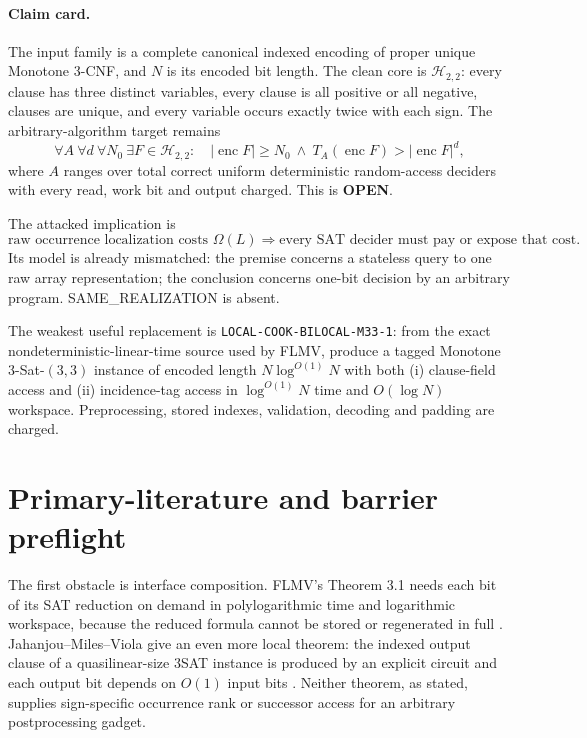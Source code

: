 \documentclass[11pt]{article}
\newcommand{\Htwo}{\mathcal H_{2,2}}
\newcommand{\OPEN}{\textbf{OPEN}}
\begin{document}
\paragraph{Claim card.}
The input family is a complete canonical indexed encoding of proper unique
Monotone 3-CNF, and $N$ is its encoded bit length.  The clean core is
$\Htwo$: every clause has three distinct variables, every clause is all
positive or all negative, clauses are unique, and every variable occurs
exactly twice with each sign.  The arbitrary-algorithm target remains
\[
 \tag{UCORE-TIME1}
 \forall A\ \forall d\ \forall N_0\ \exists F\in\Htwo:\quad
 |\operatorname{enc}F|\ge N_0\ \land\
 T_A(\operatorname{enc}F)>|\operatorname{enc}F|^d,
\]
where $A$ ranges over total correct uniform deterministic random-access
deciders with every read, work bit and output charged.  This is \OPEN.

The attacked implication is
\[
 \tag{RAW-INDEX-TO-UCORE1}
 \text{raw occurrence localization costs }\Omega(L)
 \Longrightarrow
 \text{every SAT decider must pay or expose that cost}.
\]
Its model is already mismatched: the premise concerns a stateless query to
one raw array representation; the conclusion concerns one-bit decision by
an arbitrary program.  SAME\_REALIZATION is absent.

The weakest useful replacement is \texttt{LOCAL-COOK-BILOCAL-M33-1}: from
the exact nondeterministic-linear-time source used by FLMV, produce a tagged
Monotone 3-Sat-$(3,3)$ instance of encoded length
$N\log^{O(1)}N$ with both (i) clause-field access and (ii) incidence-tag
access in $\log^{O(1)}N$ time and $O(\log N)$ workspace.  Preprocessing,
stored indexes, validation, decoding and padding are charged.

\section{Primary-literature and barrier preflight}

The first obstacle is interface composition.  FLMV's Theorem 3.1 needs each
bit of its SAT reduction on demand in polylogarithmic time and logarithmic
workspace, because the reduced formula cannot be stored or regenerated in
full \cite{flmv}.  Jahanjou--Miles--Viola give an even more local theorem:
the indexed output clause of a quasilinear-size 3SAT instance is produced by
an explicit circuit and each output bit depends on $O(1)$ input bits
\cite{jmv}.  Neither theorem, as stated, supplies sign-specific occurrence
rank or successor access for an arbitrary postprocessing gadget.
\end{document}
